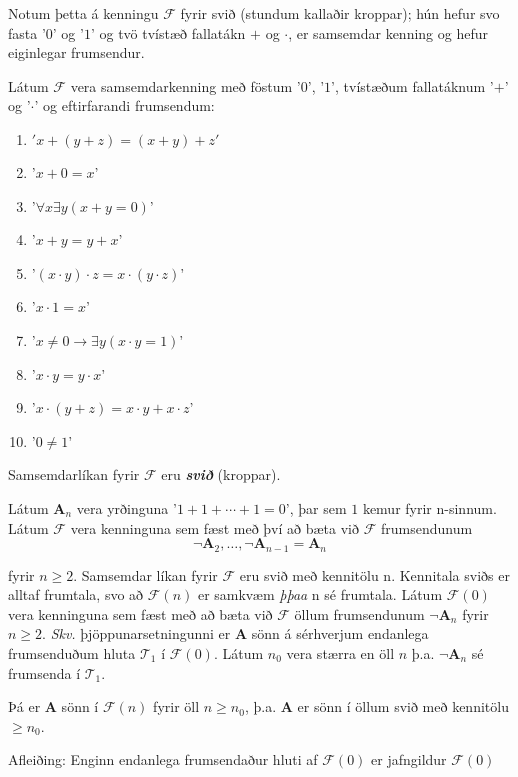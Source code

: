 \documentclass[12pt]{book}
\newcommand{\cT}{\mathcal{T}}
\newcommand{\mc}[1]{\mathcal{#1}}
\newcommand{\bA}{\mathbf{A}}
\newcommand{\emphs}[1]{\textbf{\emph{#1}}}
\begin{document}
\begin{daemi}
  Notum þetta á kenningu $\mathcal{F}$ fyrir svið (stundum kallaðir kroppar);
  hún hefur svo fasta '$0$' og '$1$' og tvö tvístæð fallatákn $+$ og $\cdot$, er samsemdar
  kenning og hefur eiginlegar frumsendur.


  Látum $\mc{F}$ vera samsemdarkenning með föstum '$0$', '$1$',
 tvístæðum fallatáknum '$+$' og '$\cdot$' og eftirfarandi frumsendum:

 \begin{enumerate}
 \item  $' x + (y + z) = (x+y) + z'$
 \item '$x + 0 = x$'
 \item '$\forall x \exists y ( x+ y = 0)$'
 \item '$x+y = y +x$'
 \item '$(x \cdot y ) \cdot z = x \cdot (y \cdot z)$'
 \item '$x \cdot 1 = x$'
 \item '$x \neq 0 \to \exists y (x \cdot y = 1)$'
 \item '$x \cdot y = y \cdot x$'
 \item '$x \cdot (y + z) = x \cdot y + x \cdot z$'
 \item '$0 \neq 1$'
 \end{enumerate}

Samsemdarlíkan fyrir $\mc{F}$ eru \emphs{svið} (kroppar).

Látum $\bA_n$ vera yrðinguna '$1+1+ \dotsb + 1 = 0$', þar sem $1$ kemur fyrir
n-sinnum. Látum $\mc{F}$ vera kenninguna sem fæst með því að bæta við $\mc{F}$
frumsendunum
\[ \lnot \bA_2, \dotsc, \lnot \bA_{n -1} = \bA_n \]

fyrir $n \geq 2$. Samsemdar líkan fyrir $\mc{F}$ eru svið með kennitölu n.
Kennitala sviðs er alltaf frumtala, svo að $\mc{F}(n)$ er samkvæm \emph{þþaa}
n sé frumtala. Látum $\mc{F}(0)$ vera kenninguna sem fæst með að bæta við $\mc{F}$
öllum frumsendunum $\lnot \bA_n$ fyrir $n \geq 2$. \emph{Skv.} þjöppunarsetningunni
er $\bA$ sönn á sérhverjum endanlega frumsenduðum hluta $\cT_1$ í $\mc{F}(0)$.
Látum $n_0$ vera stærra en öll $n$ þ.a. $\lnot \bA_n$ sé frumsenda í $\cT_1$.

Þá er $\bA$ sönn í $\mc{F}(n)$ fyrir öll $n \geq n_0$,
þ.a. $\bA$ er sönn í öllum svið með kennitölu $\geq n_0$.


\end{daemi}

Afleiðing: Enginn endanlega frumsendaður hluti af $\mc{F}(0)$ er jafngildur $\mc{F}(0)$
\end{document}
